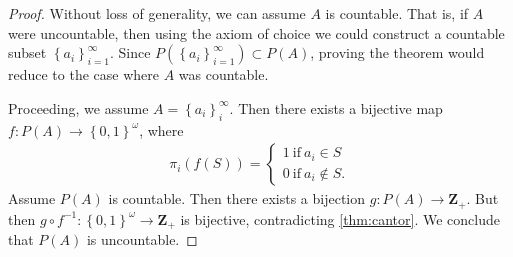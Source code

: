 \begin{proof}
Without loss of generality, we can assume $A$ is countable. That is, if $A$
were uncountable, then using the axiom of choice we could construct a
countable subset $\left\{ a_{i} \right\}_{i=1}^{\infty}$. Since
$P(\left\{ a_{i} \right\}_{i=1}^{\infty}) \subset P(A)$, proving the theorem
would reduce to the case where $A$ was countable.

Proceeding, we assume $A = \left\{ a_{i} \right\}_{i}^{\infty}$.
Then there exists a bijective map $f: P(A) \to \left\{ 0,1 \right\}^{\omega}$,
where
\begin{equation*}
\begin{split}
\pi_{i}(f(S)) = \begin{cases}
1 \ \text{if} \  a_{i} \in S \\
0 \ \text{if} \ a_{i} \not \in S.
\end{cases}
\end{split}
\end{equation*}
Assume $P(A)$ is countable. Then there exists a bijection $g: P(A) \to
\mathbf{Z}_{+}$. But then $g\circ f^{-1}: \left\{ 0,1 \right\}^{\omega} \to
\mathbf{Z}_{+}$ is bijective, contradicting \cref{thm:cantor}.
We conclude that $P(A)$ is uncountable.
\end{proof}
